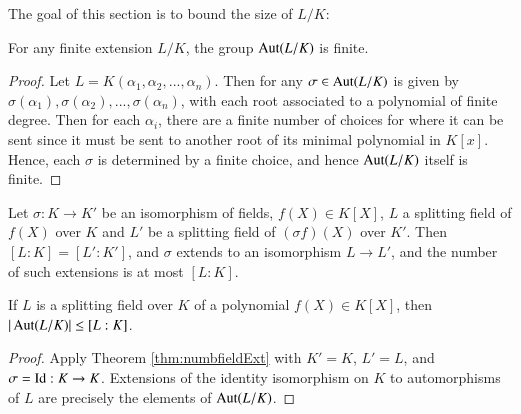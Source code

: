 The goal of this section is to bound the size of $L/K$:

\begin{theorem}
    For any finite extension $L/K$, the group $\operatorname{Aut}(L/K)$ is finite.
\end{theorem}
\begin{proof}
    Let $L = K(\alpha_1,\alpha_2,...,\alpha_n)$. Then for any $\sigma \in \operatorname{Aut}(L/K)$ is given by $\sigma(\alpha_1),\sigma(\alpha_2),...,\sigma(\alpha_n)$, with each root associated to a polynomial of finite degree. Then for each $\alpha_i$, there are a finite number of choices for where it can be sent since it must be sent to another root of its minimal polynomial in $K[x]$. Hence, each $\sigma$ is determined by a finite choice, and hence $\operatorname{Aut}(L/K)$ itself is finite.
\end{proof}


\begin{theorem}\label{thm:numbfieldExt}
    Let $\sigma:K\rightarrow K'$ be an isomorphism of fields, $f(X) \in K[X]$, $L$ a splitting field of $f(X)$ over $K$ and $L'$ be a splitting field of $(\sigma f)(X)$ over $K'$. Then $[L:K] = [L':K']$, and $\sigma$ extends to an isomorphism $L\rightarrow L'$, and the number of such extensions is at most $[L:K]$.
\end{theorem}


\begin{corollary}
    If $L$ is a splitting field over $K$ of a polynomial $f(X) \in K[X]$, then $|\operatorname{Aut}(L/K)| \leq [L:K]$.
\end{corollary}
\begin{proof}
    Apply Theorem \ref{thm:numbfieldExt} with $K' = K$, $L' = L$, and $\sigma = \operatorname{Id}:K\rightarrow K$. Extensions of the identity isomorphism on $K$ to automorphisms of $L$ are precisely the elements of $\operatorname{Aut}(L/K)$. 
\end{proof}

